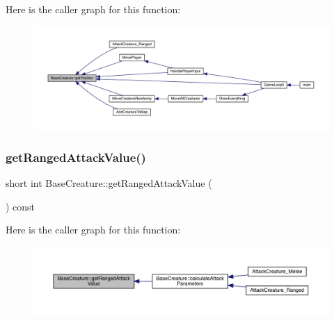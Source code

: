 Here is the caller graph for this function\+:
\nopagebreak
\begin{figure}[H]
\begin{center}
\leavevmode
\includegraphics[width=350pt]{d2/d3b/class_base_creature_a00ebdc186dd6d3c0ef3c3d1262d4363f_icgraph}
\end{center}
\end{figure}
\mbox{\label{class_base_creature_a58a174420d25df7d0865087586c66a21}} 
\subsubsection{\texorpdfstring{get\+Ranged\+Attack\+Value()}{getRangedAttackValue()}}
{\footnotesize\ttfamily short int Base\+Creature\+::get\+Ranged\+Attack\+Value (\begin{DoxyParamCaption}{ }\end{DoxyParamCaption}) const}

Here is the caller graph for this function\+:
\nopagebreak
\begin{figure}[H]
\begin{center}
\leavevmode
\includegraphics[width=350pt]{d2/d3b/class_base_creature_a58a174420d25df7d0865087586c66a21_icgraph}
\end{center}
\end{figure}
\mbox{\label{class_base_creature_a1232a2ecb3199fe79627df912078f24e}} 

